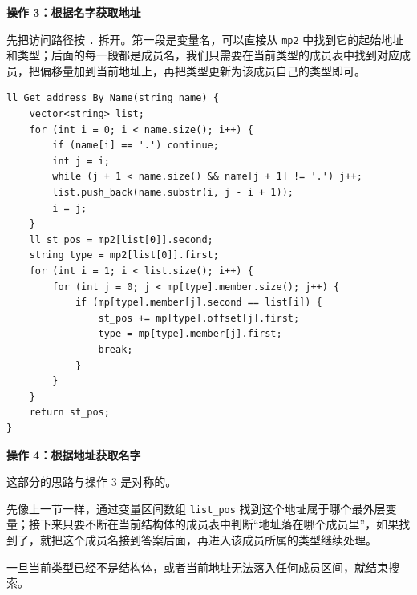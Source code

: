 \documentclass{book}
\newcommand{\code}[1]{\colorbox{codebg}{\texttt{#1}}}  %
\begin{document}
\par\medskip
\noindent\textbf{操作 3：根据名字获取地址}
\par\medskip

    先把访问路径按 \code{.} 拆开。第一段是变量名，可以直接从 \code{mp2} 中找到它的起始地址和类型；后面的每一段都是成员名，我们只需要在当前类型的成员表中找到对应成员，把偏移量加到当前地址上，再把类型更新为该成员自己的类型即可。

        \begin{lstlisting}[style = code]
ll Get_address_By_Name(string name) {
    vector<string> list;
    for (int i = 0; i < name.size(); i++) {
        if (name[i] == '.') continue;
        int j = i;
        while (j + 1 < name.size() && name[j + 1] != '.') j++;
        list.push_back(name.substr(i, j - i + 1));
        i = j;
    }
    ll st_pos = mp2[list[0]].second;
    string type = mp2[list[0]].first;
    for (int i = 1; i < list.size(); i++) {
        for (int j = 0; j < mp[type].member.size(); j++) {
            if (mp[type].member[j].second == list[i]) {
                st_pos += mp[type].offset[j].first;
                type = mp[type].member[j].first;
                break;
            }
        }
    }
    return st_pos;
}
\end{lstlisting}

\newpage
\par\medskip
\noindent\textbf{操作 4：根据地址获取名字}
\par\medskip

    这部分的思路与操作 $3$ 是对称的。

    先像上一节一样，通过变量区间数组 \code{list\_pos} 找到这个地址属于哪个最外层变量；接下来只要不断在当前结构体的成员表中判断“地址落在哪个成员里”，如果找到了，就把这个成员名接到答案后面，再进入该成员所属的类型继续处理。

    一旦当前类型已经不是结构体，或者当前地址无法落入任何成员区间，就结束搜索。
\end{document}
